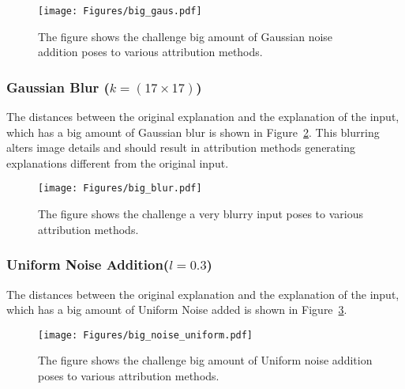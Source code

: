 \begin{figure}[ht!]
	\begin{center}
		\texttt{[image: Figures/big\_gaus.pdf]}
	\end{center}
	\caption{The figure shows the challenge big amount of Gaussian noise addition poses to various attribution methods.}
	\label{Fig:big_gaus}
\end{figure} 

\subsubsection{Gaussian Blur ($k = (17 \times 17)$)}
The distances between the original explanation and the explanation of the input, which has a big amount of Gaussian blur is shown in Figure~\ref{Fig:big_blur}. This blurring alters image details and should result in attribution methods generating explanations different from the original input.



\begin{figure}[ht!]
	\begin{center}
		\texttt{[image: Figures/big\_blur.pdf]}
	\end{center}
	\caption{The figure shows the challenge a very blurry input poses to various attribution methods.}
	\label{Fig:big_blur}
\end{figure} 

\subsubsection{Uniform Noise Addition($l = 0.3$)}
The distances between the original explanation and the explanation of the input, which has a big amount of Uniform Noise added is shown in Figure~\ref{Fig:big_noise_uniform}. 


\begin{figure}[ht!]
	\begin{center}
		\texttt{[image: Figures/big\_noise\_uniform.pdf]}
	\end{center}
	\caption{The figure shows the challenge big amount of Uniform noise addition poses to various attribution methods.}
	\label{Fig:big_noise_uniform}
\end{figure} 

